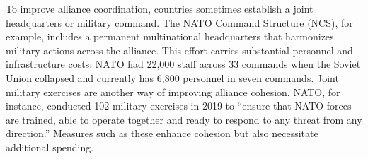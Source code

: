To improve alliance coordination, countries sometimes establish a joint headquarters or military command. The NATO Command Structure (NCS), for example, includes a permanent multinational headquarters that harmonizes military actions across the alliance. This effort carries substantial personnel and infrastructure costs: NATO had 22,000 staff across 33 commands when the Soviet Union collapsed and currently has 6,800 personnel in seven commands.\autocite{natofactsheet201802} Joint military exercises are another way of improving alliance cohesion. NATO, for instance, conducted 102 military exercises in 2019 to ``ensure that NATO forces are trained, able to operate together and ready to respond to any threat from any direction.''\autocite{natofactsheet201902} Measures such as these enhance cohesion but also necessitate additional spending. 


